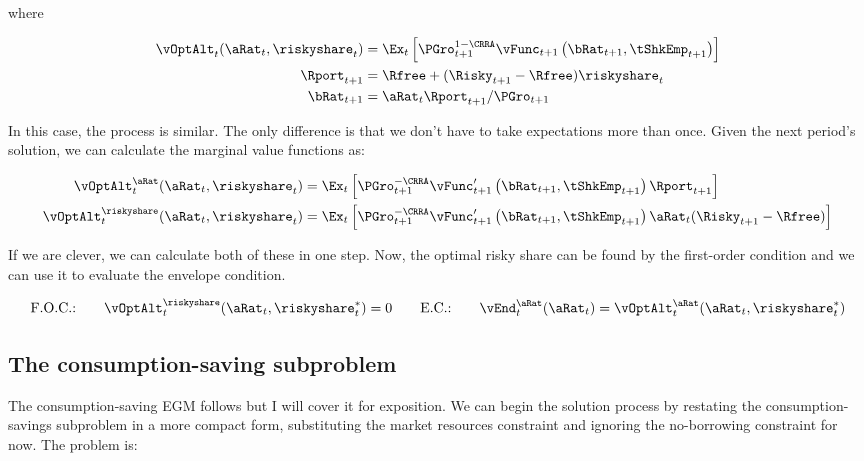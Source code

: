 \documentclass[\econtexRoot/SequentialEGM]{subfiles}
\begin{document}
where

\begin{equation}
  \begin{split}
    \vOptAlt_{t}(\aRat_{t}, \riskyshare_{t}) & =  \Ex_{t} \left[ \PGro_{t+1}^{1-\CRRA} \vFunc_{t+1}\left(\bRat_{t+1}, \tShkEmp_{t+1}\right)   \right] \\
    \Rport_{t+1} & = \Rfree + (\Risky_{t+1} - \Rfree) \riskyshare_{t} \\
    \bRat_{t+1} & = \aRat_{t} \Rport_{t+1} / \PGro_{t+1}
  \end{split}
\end{equation}

In this case, the process is similar. The only difference is that we don't have to take expectations more than once. Given the next period's solution, we can calculate the marginal value functions as:

\begin{equation}
  \begin{split}
    \vOptAlt_{t}^{\aRat}(\aRat_{t}, \riskyshare_{t}) & =  \Ex_{t} \left[ \PGro_{t+1}^{-\CRRA} \vFunc_{t+1}'\left(\bRat_{t+1}, \tShkEmp_{t+1}\right) \Rport_{t+1}   \right] \\
    \vOptAlt_{t}^{\riskyshare}(\aRat_{t}, \riskyshare_{t}) & =  \Ex_{t} \left[ \PGro_{t+1}^{-\CRRA} \vFunc_{t+1}'\left(\bRat_{t+1}, \tShkEmp_{t+1}\right) \aRat_{t} (\Risky_{t+1} - \Rfree)   \right] \\
  \end{split}
\end{equation}

If we are clever, we can calculate both of these in one step. Now, the optimal risky share can be found by the first-order condition and we can use it to evaluate the envelope condition.

\begin{equation}
  \text{F.O.C.:} \qquad \vOptAlt_{t}^{\riskyshare}(\aRat_{t}, \riskyshare_{t}^{*})  = 0 \qquad
  \text{E.C.:} \qquad \vEnd_{t}^{\aRat}(\aRat_{t}) = \vOptAlt_{t}^{\aRat}(\aRat_{t}, \riskyshare_{t}^{*})
\end{equation}

\subsection{The consumption-saving subproblem}

The consumption-saving EGM follows \cite{Carroll2006} but I will cover it for exposition. We can begin the solution process by restating the consumption-savings subproblem in a more compact form, substituting the market resources constraint and ignoring the no-borrowing constraint for now. The problem is:
\end{document}
